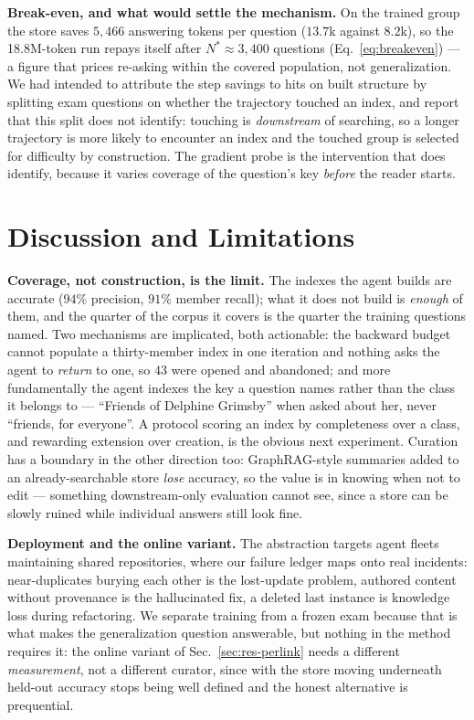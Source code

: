 \documentclass[conference]{IEEEtran}
\begin{document}
\textbf{Break-even, and what would settle the mechanism.} On the trained
group the store saves $5{,}466$ answering tokens per question ($13.7$k
against $8.2$k), so the 18.8M-token run repays itself after $N^{*} \approx
3{,}400$ questions (Eq.~\ref{eq:breakeven}) --- a figure that prices
re-asking within the covered population, not generalization. We had intended
to attribute the step savings to hits on built structure by splitting exam
questions on whether the trajectory touched an index, and report that this
split does not identify: touching is \emph{downstream} of searching, so a
longer trajectory is more likely to encounter an index and the touched group
is selected for difficulty by construction. The gradient probe is the
intervention that does identify, because it varies coverage of the
question's key \emph{before} the reader starts.

\section{Discussion and Limitations}\label{sec:disc}
\textbf{Coverage, not construction, is the limit.} The indexes the agent
builds are accurate ($94\%$ precision, $91\%$ member recall); what it does
not build is \emph{enough} of them, and the quarter of the corpus it covers
is the quarter the training questions named. Two mechanisms are implicated,
both actionable: the backward budget cannot populate a thirty-member index
in one iteration and nothing asks the agent to \emph{return} to one, so $43$
were opened and abandoned; and more fundamentally the agent indexes the key
a question names rather than the class it belongs to --- ``Friends of
Delphine Grimsby'' when asked about her, never ``friends, for everyone''. A
protocol scoring an index by completeness over a class, and rewarding
extension over creation, is the obvious next experiment. Curation has a
boundary in the other direction too: GraphRAG-style summaries added to an
already-searchable store \emph{lose} accuracy, so the value is in knowing
when not to edit --- something downstream-only evaluation cannot see, since
a store can be slowly ruined while individual answers still look fine.

\textbf{Deployment and the online variant.} The abstraction targets agent
fleets maintaining shared repositories, where our failure ledger maps onto
real incidents: near-duplicates burying each other is the lost-update
problem, authored content without provenance is the hallucinated fix, a
deleted last instance is knowledge loss during refactoring. We separate
training from a frozen exam because that is what makes the generalization
question answerable, but nothing in the method requires it: the online
variant of Sec.~\ref{sec:res-perlink} needs a different \emph{measurement},
not a different curator, since with the store moving underneath held-out
accuracy stops being well defined and the honest alternative is prequential.
\end{document}
